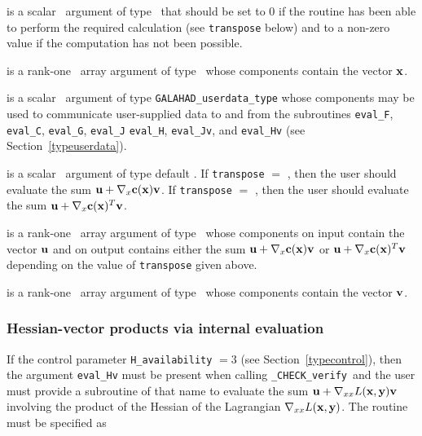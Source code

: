 \documentclass{galahad}
\newcommand{\packagename}{CHECK}
\newcommand{\fullpackagename}{\libraryname\_\packagename}
\newcommand{\solver}{{\tt \fullpackagename\_verify}}
\begin{document}
\begin{description}

 is a scalar \intentout\ argument of type \integer\
that should be set to 0 if the routine has been able to perform the
required calculation (see {\tt transpose} below) and to a non-zero
value if the computation has not been possible.

 is a rank-one \intentin\ array argument of type \realdp\
whose components contain the vector ${\mathbf{x}}$.

 is a scalar \intentinout\ argument of type 
{\tt GALAHAD\_userdata\_type} whose components may be used
to communicate user-supplied data to and from the
subroutines {\tt eval\_F}, {\tt eval\_C}, {\tt eval\_G}, {\tt eval\_J}
{\tt eval\_H}, {\tt eval\_Jv}, and {\tt eval\_Hv} 
(see Section~\ref{typeuserdata}).

 is a scalar \intentin\ argument of type default
\logical.  If {\tt transpose} $=$ \false, then the user should evaluate the
sum ${\mathbf{u}} + \nabla_x {\mathbf{c}}({\mathbf{x}}) {\mathbf{v}}$. If {\tt transpose} $=$ \true,
then the user should evaluate the sum ${\mathbf{u}} + \nabla_x {\mathbf{c}}({\mathbf{x}})^T {\mathbf{v}}$.   

\ittf{U} is a rank-one \intentinout\ array argument of type \realdp\
whose components on input contain the vector ${\mathbf{u}}$ and on output contains
either the sum ${\mathbf{u}} + \nabla_x {\mathbf{c}}({\mathbf{x}}) {\mathbf{v}}$ or ${\mathbf{u}} + \nabla_x {\mathbf{c}}({\mathbf{x}})^T
{\mathbf{v}}$ depending on the value of {\tt transpose} given above.

\ittf{V} is a rank-one \intentin\ array argument of type \realdp\
whose components contain the vector ${\mathbf{v}}$.

\end{description}


\subsubsection{Hessian-vector products via internal evaluation\label{hvfv}}

If the control parameter {\tt H\_availability} $=3$ (see
Section~\ref{typecontrol}), then the argument {\tt eval\_Hv} must be
present when calling \solver\ and the
user must provide a subroutine of that name to evaluate the
sum ${\mathbf{u}} + \nabla_{xx} L({\mathbf{x}},{\mathbf{y}}) {\mathbf{v}}$ involving the
product of the Hessian of the Lagrangian $\nabla_{xx} L({\mathbf{x}},{\mathbf{y}})$.
The routine must be specified as
\end{document}
